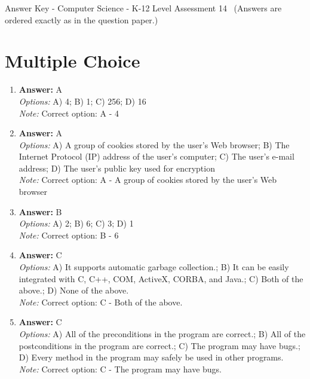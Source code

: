 \documentclass[12pt]{article}
\begin{document}
\begin{center}
Answer Key - Computer Science - K-12 Level Assessment 14 \
\small (Answers are ordered exactly as in the question paper.)
\end{center}

\section*{Multiple Choice}
\begin{enumerate}[label=\arabic*.]
\item \textbf{Answer:} A
\\ \textit{Options:} A) 4; B) 1; C) 256; D) 16
\\ \textit{Note:} Correct option: A - 4
\item \textbf{Answer:} A
\\ \textit{Options:} A) A group of cookies stored by the user's Web browser; B) The Internet Protocol (IP) address of the user's computer; C) The user's e-mail address; D) The user's public key used for encryption
\\ \textit{Note:} Correct option: A - A group of cookies stored by the user's Web browser
\item \textbf{Answer:} B
\\ \textit{Options:} A) 2; B) 6; C) 3; D) 1
\\ \textit{Note:} Correct option: B - 6
\item \textbf{Answer:} C
\\ \textit{Options:} A) It supports automatic garbage collection.; B) It can be easily integrated with C, C++, COM, ActiveX, CORBA, and Java.; C) Both of the above.; D) None of the above.
\\ \textit{Note:} Correct option: C - Both of the above.
\item \textbf{Answer:} C
\\ \textit{Options:} A) All of the preconditions in the program are correct.; B) All of the postconditions in the program are correct.; C) The program may have bugs.; D) Every method in the program may safely be used in other programs.
\\ \textit{Note:} Correct option: C - The program may have bugs.
\end{enumerate}
\end{document}
